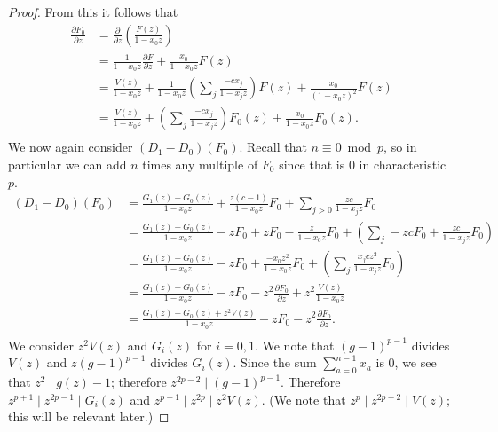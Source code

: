 \documentclass{amsart}
\numberwithin{equation}{section}
\theoremstyle{definition}
\begin{document}
\begin{proof}
From this it follows that
\begin{align*}
\frac{\partial F_0}{\partial z} &= \frac{\partial}{\partial z}\left(\frac{F(z)}{1-x_0z}\right)\\
&=\frac{1}{1-x_0z} \frac{\partial F}{\partial z}+\frac{x_0}{1-x_0z} F(z)\\
&=\frac{V(z)}{1-x_0z}+\frac{1}{1-x_0z}\left(\sum_j \frac{-cx_j}{1-x_jz}\right)F(z)+\frac{x_0}{(1-x_0z)^2} F(z)\\
&=\frac{V(z)}{1-x_0z}+\left(\sum_j \frac{-cx_j}{1-x_jz}\right)F_0(z)+\frac{x_0}{1-x_0z} F_0(z).\\
\end{align*}
We now again consider $(D_1-D_0)(F_0)$. Recall that $n \equiv 0 \bmod p$, so in particular we can add $n$ times any multiple of $F_0$ since that is $0$ in characteristic $p$. 
\begin{align*}
(D_1-D_0)(F_0)&=\frac{G_1(z)-G_0(z)}{1-x_0z}+\frac{z(c-1)}{1-x_0z}F_0+\sum_{j>0} \frac{zc}{1-x_jz}F_0\\
&=\frac{G_1(z)-G_0(z)}{1-x_0z}-zF_0+zF_0-\frac{z}{1-x_0z}F_0+\left(\sum_{j} -zcF_0+\frac{zc}{1-x_jz}F_0\right)\\
&=\frac{G_1(z)-G_0(z)}{1-x_0z}-zF_0+\frac{-x_0z^2}{1-x_0z}F_0+\left(\sum_{j} \frac{x_jcz^2}{1-x_jz}F_0\right)\\
&=\frac{G_1(z)-G_0(z)}{1-x_0z}-zF_0-z^2\frac{\partial F_0}{\partial z}+z^2\frac{V(z)}{1-x_0z}\\
&=\frac{G_1(z)-G_0(z)+z^2V(z)}{1-x_0z}-zF_0-z^2\frac{\partial F_0}{\partial z}.\\
\end{align*}
We consider $z^2V(z)$ and $G_i(z)$ for $i=0,1$. We note that $(g-1)^{p-1}$ divides $V(z)$ and $z(g-1)^{p-1}$ divides $G_i(z)$. Since the sum $\sum_{a=0}^{n-1} x_a$ is $0$, we see that $z^2 \mid g(z)-1$; therefore $z^{2p-2} \mid (g-1)^{p-1}$. Therefore $z^{p+1} \mid z^{2p-1} \mid G_i(z)$ and $z^{p+1} \mid z^{2p} \mid z^2V(z)$. (We note that $z^p \mid z^{2p-2} \mid V(z)$; this will be relevant later.)


\end{proof}
\end{document}
